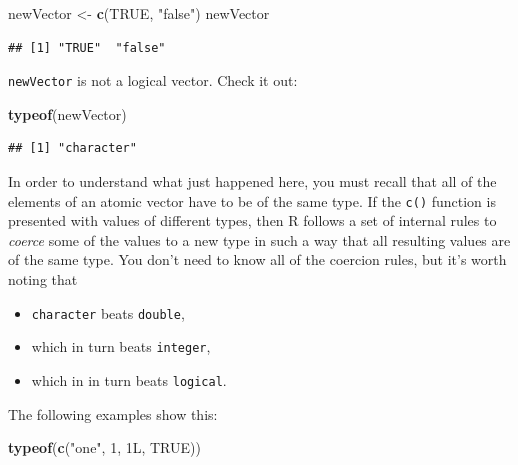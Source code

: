 \documentclass[]{book}
\makeatletter
\newenvironment{Shaded}{\begin{snugshade}}{\end{snugshade}}
\newcommand{\KeywordTok}[1]{\textcolor[rgb]{0.13,0.29,0.53}{\textbf{#1}}}
\newcommand{\DecValTok}[1]{\textcolor[rgb]{0.00,0.00,0.81}{#1}}
\newcommand{\StringTok}[1]{\textcolor[rgb]{0.31,0.60,0.02}{#1}}
\newcommand{\OtherTok}[1]{\textcolor[rgb]{0.56,0.35,0.01}{#1}}
\newcommand{\NormalTok}[1]{#1}
\providecommand{\tightlist}{%
  \setlength{\itemsep}{0pt}\setlength{\parskip}{0pt}}
\newenvironment{kframe}{%
\medskip{}
\setlength{\fboxsep}{.8em}
 \def\at@end@of@kframe{}%
 \ifinner\ifhmode%
  \def\at@end@of@kframe{\end{minipage}}%
  \begin{minipage}{\columnwidth}%
 \fi\fi%
 \def\FrameCommand##1{\hskip\@totalleftmargin \hskip-\fboxsep
 \colorbox{shadecolor}{##1}\hskip-\fboxsep
     \hskip-\linewidth \hskip-\@totalleftmargin \hskip\columnwidth}%
 \MakeFramed {\advance\hsize-\width
   \@totalleftmargin\z@ \linewidth\hsize
   \@setminipage}}%
 {\par\unskip\endMakeFramed%
 \at@end@of@kframe}
\renewenvironment{Shaded}{\begin{kframe}}{\end{kframe}}
\theoremstyle{definition}
\theoremstyle{definition}
\theoremstyle{definition}
\theoremstyle{remark}
\makeatother
\begin{document}
\begin{Shaded}
\begin{Highlighting}[]
\NormalTok{newVector <-}\StringTok{ }\KeywordTok{c}\NormalTok{(}\OtherTok{TRUE}\NormalTok{, }\StringTok{"false"}\NormalTok{)}
\NormalTok{newVector}
\end{Highlighting}
\end{Shaded}

\begin{verbatim}
## [1] "TRUE"  "false"
\end{verbatim}

\texttt{newVector} is not a logical vector. Check it out:

\begin{Shaded}
\begin{Highlighting}[]
\KeywordTok{typeof}\NormalTok{(newVector)}
\end{Highlighting}
\end{Shaded}

\begin{verbatim}
## [1] "character"
\end{verbatim}

In order to understand what just happened here, you must recall that all
of the elements of an atomic vector have to be of the same type. If the
\texttt{c()} function is presented with values of different types, then
R follows a set of internal rules to \emph{coerce} some
of the values to a new type in such a way that all resulting values are
of the same type. You don't need to know all of the coercion rules, but
it's worth noting that

\begin{itemize}
\tightlist
\item
  \texttt{character} beats \texttt{double},
\item
  which in turn beats \texttt{integer},
\item
  which in in turn beats \texttt{logical}.
\end{itemize}

The following examples show this:

\begin{Shaded}
\begin{Highlighting}[]
\KeywordTok{typeof}\NormalTok{(}\KeywordTok{c}\NormalTok{(}\StringTok{"one"}\NormalTok{, }\DecValTok{1}\NormalTok{, 1L, }\OtherTok{TRUE}\NormalTok{))}
\end{Highlighting}
\end{Shaded}
\end{document}
